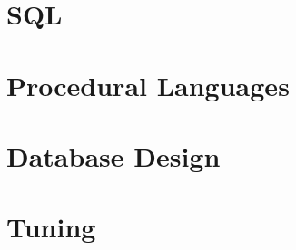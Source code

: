 \documentclass[oneside]{book}
\begin{document}


\part{SQL}

\part{Procedural Languages}
\label{part:plang}
\part{Database Design}
\part{Tuning}

\appendix

\listoffigures
\listoftables
\printindex{}
\end{document}
